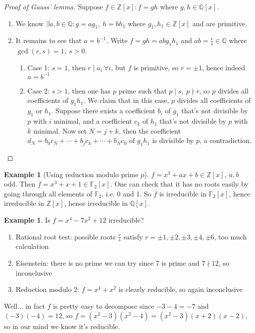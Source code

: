 \documentclass[a4paper]{article}
\newcommand{\Z}{\mathbb Z}
\newcommand{\Q}{\mathbb Q}
\theoremstyle{definition}
\newtheorem{example}[defn]{Example}
\begin{document}
\begin{proof}[Proof of Gauss' lemma]
Suppose $f\in\Z[x]:f=gh$ where $g,h\in\Q[x]$.
\begin{enumerate}
\item We know $\exists a,b\in\Q:g=ag_1,\ h=bh_1$ where $g_1,h_1\in\Z[x]$ and are primitive.
\item It remains to see that $a=b^{-1}$. Write $f=gh=ab g_1h_1$ and $ab=\frac{r}{s}\in\Q$ where $\gcd(r,s)=1,\ s>0$.
\begin{enumerate}
\item Case 1: $s=1$, then $r\mid a_i \ \forall i$, but $f$ is primitive, so $r=\pm 1$, hence indeed $a=b^{-1}$
\item Case 2: $s>1$, then one has $p$ prime such that $p\mid s,\ p\nmid r$, so $p$ divides all coefficients of $g_1h_1$. We claim that in this case, $p$ divides all coefficients of $g_1$ or $h_1$. Suppose there exists a coefficient $b_i$ of $g_1$ that's not divisible by $p$ with $i$ minimal, and a coefficient $c_k$ of $h_1$ that's not divisible by $p$ with $k$ minimal. Now set $N=j+k$, then the coefficient $d_N=b_0c_N+\cdots+b_jc_k+\cdots+b_Nc_0$ of $g_1h_1$ is divisible by $p$, a contradiction.
\end{enumerate}
\end{enumerate}
\end{proof}

\begin{example}[Using reduction modulo prime $p$]
$f=x^3+ax+b\in\Z[x],\ a,b$ odd. Then $\overline f=x^3+x+1\in\mathbb F_2[x]$. One can check that it has no roots easily by going through all elements of $\mathbb F_2$, i.e. 0 and 1. So $\overline f$ is irreducible in $\mathbb F_2[x]$, hence irreducible in $\Z[x]$, hence irreducible in $\Q[x]$.
\end{example}

\begin{example}
Is $f=x^4-7x^2+12$ irreducible?
\begin{enumerate}
\item Rational root test: possible roots $\frac{r}{s}$ satisfy $r=\pm1,\pm2,\pm3,\pm4,\pm6$, too much calculation
\item Eisenstein: there is no prime we can try since 7 is prime and $7\nmid 12$, so inconclusive
\item Reduction modulo 2: $\overline f=x^4+x^2$ is clearly reducible, so again inconclusive
\end{enumerate}
Well... in fact $f$ is pretty easy to decompose since $-3-4=-7$ and $(-3)(-4)=12$, so $f=(x^2-3)(x^2-4)=(x^2-3)(x+2)(x-2)$, so in our mind we know it's reducible.
\end{example}
\end{document}
